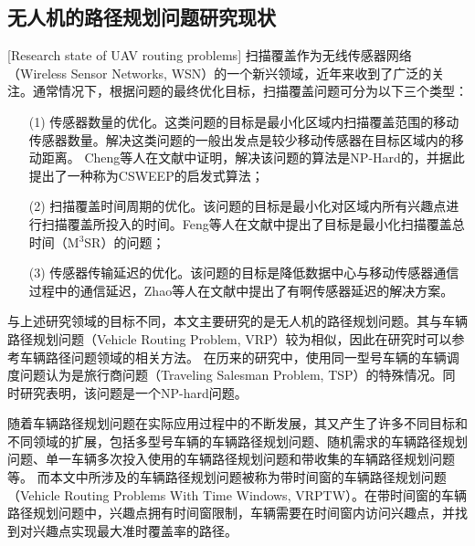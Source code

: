 \subsection{无人机的路径规划问题研究现状}[Research state of UAV routing problems]
扫描覆盖作为无线传感器网络（Wireless Sensor Networks, WSN）的一个新兴领域，近年来收到了广泛的关注。通常情况下，根据问题的最终优化目标，扫描覆盖问题可分为以下三个类型：
\begin{itemize}
  \item [(1)] 传感器数量的优化。这类问题的目标是最小化区域内扫描覆盖范围的移动传感器数量。解决这类问题的一般出发点是较少移动传感器在目标区域内的移动距离。
  Cheng等人在文献中证明，解决该问题的算法是NP-Hard的，并据此提出了一种称为CSWEEP的启发式算法\cite{2008Sweep}；
  \item [(2)] 扫描覆盖时间周期的优化。该问题的目标是最小化对区域内所有兴趣点进行扫描覆盖所投入的时间。Feng等人在文献中提出了目标是最小化扫描覆盖总时间（M$^3$SR）的问题\cite{2015Shorten}；
  \item [(3)] 传感器传输延迟的优化。该问题的目标是降低数据中心与移动传感器通信过程中的通信延迟，Zhao等人在文献中提出了有啊传感器延迟的解决方案\cite{2012zhao}。
\end{itemize}


与上述研究领域的目标不同，本文主要研究的是无人机的路径规划问题。其与车辆路径规划问题（Vehicle Routing Problem, VRP）较为相似，因此在研究时可以参考车辆路径问题领域的相关方法。
在历来的研究中，使用同一型号车辆的车辆调度问题认为是旅行商问题（Traveling Salesman Problem, TSP）的特殊情况\cite{bektas2006multiple}。同时研究表明，该问题是一个NP-hard问题\cite{lenstra1981complexity}。


随着车辆路径规划问题在实际应用过程中的不断发展，其又产生了许多不同目标和不同领域的扩展，包括多型号车辆的车辆路径规划问题\cite{pan2021multi}、随机需求的车辆路径规划问题\cite{saint2021time}、单一车辆多次投入使用的车辆路径规划问题\cite{euchi2021hybrid}和带收集的车辆路径规划问题\cite{fan2021time}等。
而本文中所涉及的车辆路径规划问题被称为带时间窗的车辆路径规划问题（Vehicle Routing Problems With Time Windows, VRPTW）。在带时间窗的车辆路径规划问题中，兴趣点拥有时间窗限制，车辆需要在时间窗内访问兴趣点，并找到对兴趣点实现最大准时覆盖率的路径\cite{ren2022vehicle}。


